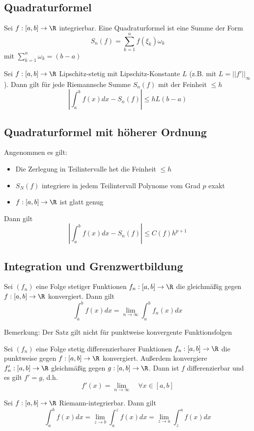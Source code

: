 	\subsection{Quadraturformel}
		\begin{Definition} [ Quadraturformel]
			Sei $f:[a, b]\to\R$ integrierbar. Eine Quadraturformel ist eine Summe der Form
			$$
				S_n(f)=\sum_{k=1}^nf(\xi_k)\omega_k
			$$
			mit $\displaystyle\sum_{k=1}^n\omega_k=(b-a)$
		\end{Definition}
		\begin{Satz} [ ]
			 Sei $f:[a, b]\to\R$ Lipschitz-stetig mit Lipschitz-Konstante $L$ (z.B. mit $L=||f'||_\infty$). Dann gilt für jede Riemannsche Summe $S_n(f)$ mit der Feinheit $\leq h$
			 $$
			 	|\int_a^bf(x)dx-S_n(f)|\leq hL(b-a)
			 $$
		\end{Satz}
	\subsection{Quadraturformel mit höherer Ordnung}
		\begin{Satz} [ Fehlerabschätzung]
			Angenommen es gilt:
			\begin{itemize}
				\item Die Zerlegung in Teilintervalle het die Feinheit $\leq h$
				\item $S_N(f)$ integriere in jedem Teilintervall Polynome vom Grad $p$ exakt
				\item $f:[a, b]\to\R$ ist glatt genug
			\end{itemize}
			Dann gilt
			$$
				|\int_a^bf(x)dx-S_n(f)|\leq C(f)h^{p+1}
			$$
		\end{Satz}
	\subsection{Integration und Grenzwertbildung}
		\begin{Satz} [ ]
			Sei $(f_n)$ eine Folge stetiger Funktionen $f_n:[a, b]\to\R$ die gleichmäßig gegen $f:[a, b]\to\R$ konvergiert. Dann gilt
			$$
				\int_a^bf(x)dx=\lim_{n\to\infty}\int_a^bf_n(x)dx
			$$
		\end{Satz}
		Bemerkung: \newline
		Der Satz gilt nicht für punktweise konvergente Funktionsfolgen
		\begin{Satz} [ ]
			Sei $(f_n)$ eine Folge stetig differenzierbarer Funktionen $f_n:[a, b]\to\R$ die punktweise gegen $f:[a, b]\to\R$ konvergiert. Außerdem konvergiere $f'_n:[a, b]\to\R$ gleichmäßig gegen $g:[a, b]\to\R$. Dann ist $f$ differenzierbar und es gilt $f'=g$, d.h.
			$$
				f'(x)=\lim_{n\to\infty} \quad \forall x \in [a, b]
			$$
		\end{Satz}
		\begin{Satz} [ ]
			Sei $f:[a, b]\to\R$ Riemann-integrierbar. Dann gilt
			$$
				\int_a^bf(x)dx=\lim_{z\to b}\int_a^zf(x)dx=\lim_{z\to a}\int_z^af(x)dx
			$$
		\end{Satz}
